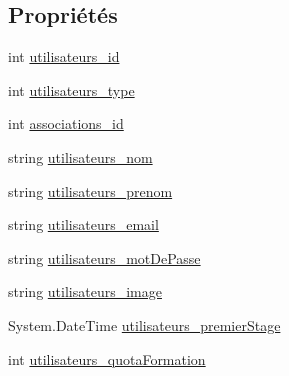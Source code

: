 \subsection*{Propriétés}
\begin{DoxyCompactItemize}
\item 
int \hyperlink{classforma_1_1formadb_data_set_1_1utilisateurs_row_ad55980363d6a8d7549b732b57a6cfa29}{utilisateurs\+\_\+id}
\item 
int \hyperlink{classforma_1_1formadb_data_set_1_1utilisateurs_row_a0e0006a8fca04d95b3040962f26c02b5}{utilisateurs\+\_\+type}
\item 
int \hyperlink{classforma_1_1formadb_data_set_1_1utilisateurs_row_a0f0be0d6e0e048e7f783613c459f3288}{associations\+\_\+id}
\item 
string \hyperlink{classforma_1_1formadb_data_set_1_1utilisateurs_row_a777381124ef13b97d1fae223e6cf54f6}{utilisateurs\+\_\+nom}
\item 
string \hyperlink{classforma_1_1formadb_data_set_1_1utilisateurs_row_a45b89a2058abd30347188dcbc1badac2}{utilisateurs\+\_\+prenom}
\item 
string \hyperlink{classforma_1_1formadb_data_set_1_1utilisateurs_row_a35a5dfe2196ff7b3c7be8e170d612149}{utilisateurs\+\_\+email}
\item 
string \hyperlink{classforma_1_1formadb_data_set_1_1utilisateurs_row_a9ec5ae6adaef079571fc54b5d3b58ebd}{utilisateurs\+\_\+mot\+De\+Passe}
\item 
string \hyperlink{classforma_1_1formadb_data_set_1_1utilisateurs_row_af712bc91e560cc641bb96a29d2a396ea}{utilisateurs\+\_\+image}
\item 
System.\+Date\+Time \hyperlink{classforma_1_1formadb_data_set_1_1utilisateurs_row_ac548a848c79c1ab93d9ad77018531f44}{utilisateurs\+\_\+premier\+Stage}
\item 
int \hyperlink{classforma_1_1formadb_data_set_1_1utilisateurs_row_a8afc5c9e04f0033e99afe560d2e44d73}{utilisateurs\+\_\+quota\+Formation}
\end{DoxyCompactItemize}


